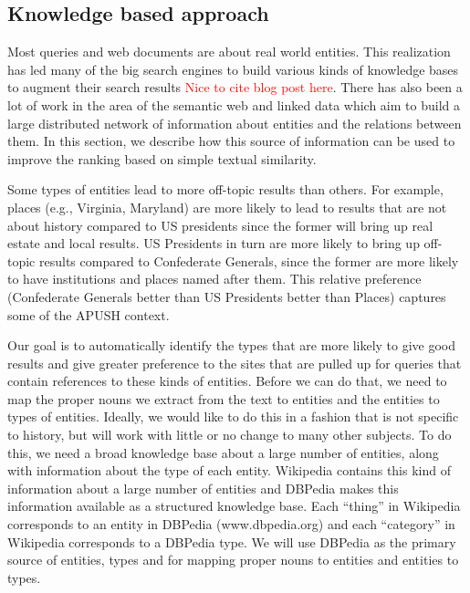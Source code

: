 \documentclass[pdfpagelabels=false,plainpages=true]{acm_proc_article-sp}
\begin{document}
\subsection{Knowledge based approach}

Most queries and web documents are about real world entities.  This realization
has led many of the big search engines to build various kinds of knowledge
bases to augment their search results \textcolor{red}{Nice to cite blog post
  here}. There has also been a lot of work in the area of the semantic web
and linked data \cite{berners2001semantic,bizer2008linked} which aim to build a
large distributed network of information about entities and the relations
between them. In this section, we describe how this source of information can be
used to improve the ranking based on simple textual similarity.  

Some types of entities lead to more off-topic results than others. For example,
places (e.g., Virginia, Maryland) are more likely to lead to results that are
not about history compared to US presidents since the former will bring up real
estate and local results. US Presidents in turn are more likely to bring up
off-topic results compared to Confederate Generals, since the former are more
likely to have institutions and places named after them. This relative preference
(Confederate Generals better than US Presidents better than Places) captures
some of the APUSH context. 

Our goal is to automatically identify the types that are more likely to give
good results and give greater preference to the sites that are pulled up for
queries that contain references to these kinds of entities. Before we can do
that, we need to map the proper nouns we extract from the text to entities and
the entities to types of entities. Ideally, we would like to do this in a
fashion that is not specific to history, but will work with little or no change
to many other subjects. To do this, we need a broad knowledge base about a large
number of entities, along with information about the type of each
entity. Wikipedia contains this kind of information about a large number of
entities and DBPedia makes this information available as a structured knowledge
base. Each ``thing'' in Wikipedia corresponds to an entity in DBPedia
(www.dbpedia.org) and each ``category'' in Wikipedia corresponds to a DBPedia
type. We will use DBPedia as the primary source of entities, types and for
mapping proper nouns to entities and entities to types. 
\end{document}
